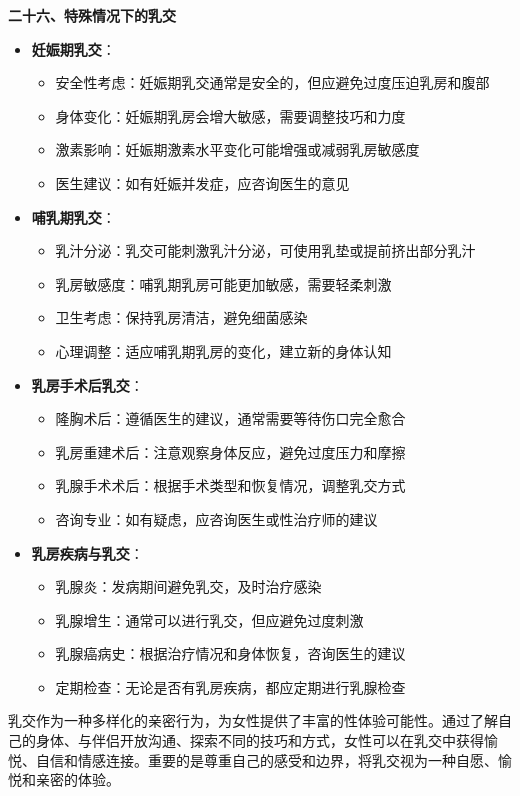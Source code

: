 \documentclass[12pt,UTF8]{ctexbook}
\begin{document}
  \textbf{二十六、特殊情况下的乳交}
  \begin{itemize}
  \item \textbf{妊娠期乳交}：
    \begin{itemize}
    \item 安全性考虑：妊娠期乳交通常是安全的，但应避免过度压迫乳房和腹部
    \item 身体变化：妊娠期乳房会增大敏感，需要调整技巧和力度
    \item 激素影响：妊娠期激素水平变化可能增强或减弱乳房敏感度
    \item 医生建议：如有妊娠并发症，应咨询医生的意见
    \end{itemize}
  \item \textbf{哺乳期乳交}：
    \begin{itemize}
    \item 乳汁分泌：乳交可能刺激乳汁分泌，可使用乳垫或提前挤出部分乳汁
    \item 乳房敏感度：哺乳期乳房可能更加敏感，需要轻柔刺激
    \item 卫生考虑：保持乳房清洁，避免细菌感染
    \item 心理调整：适应哺乳期乳房的变化，建立新的身体认知
    \end{itemize}
  \item \textbf{乳房手术后乳交}：
    \begin{itemize}
    \item 隆胸术后：遵循医生的建议，通常需要等待伤口完全愈合
    \item 乳房重建术后：注意观察身体反应，避免过度压力和摩擦
    \item 乳腺手术术后：根据手术类型和恢复情况，调整乳交方式
    \item 咨询专业：如有疑虑，应咨询医生或性治疗师的建议
    \end{itemize}
  \item \textbf{乳房疾病与乳交}：
    \begin{itemize}
    \item 乳腺炎：发病期间避免乳交，及时治疗感染
    \item 乳腺增生：通常可以进行乳交，但应避免过度刺激
    \item 乳腺癌病史：根据治疗情况和身体恢复，咨询医生的建议
    \item 定期检查：无论是否有乳房疾病，都应定期进行乳腺检查
    \end{itemize}
  \end{itemize}

乳交作为一种多样化的亲密行为，为女性提供了丰富的性体验可能性。通过了解自己的身体、与伴侣开放沟通、探索不同的技巧和方式，女性可以在乳交中获得愉悦、自信和情感连接。重要的是尊重自己的感受和边界，将乳交视为一种自愿、愉悦和亲密的体验。
\end{document}
